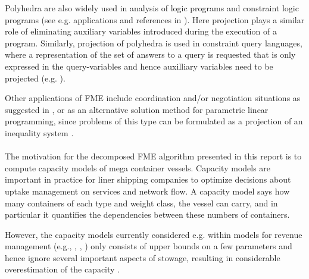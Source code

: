 Polyhedra are also widely used in analysis of logic programs and constraint logic programs (see e.g. applications and references in \cite{benoy05}). %
Here projection plays a similar role %
of eliminating auxiliary variables introduced during the execution of a program. Similarly, projection of polyhedra is used in constraint query languages, %
where a representation of the set of answers to a query is requested that is only expressed in the query-variables and hence auxilliary variables need to be projected (e.g. \cite{lassez90}).  

Other applications of FME include coordination and/or negotiation situations as suggested in \cite{lukatskii08}, 
or as an alternative solution method for parametric linear programming, since problems of this type can be formulated as a projection of an inequality system \cite{jones08}.
\\
\\
The motivation for the decomposed FME algorithm presented in this report is to compute capacity models of mega container vessels. Capacity models are important in practice for liner shipping companies to optimize decisions about uptake management on services and network flow. A capacity model says how many containers of each type and weight class, the vessel can carry, and in particular it {quantifies} the dependencies between these numbers of containers. %

However, the capacity models currently considered e.g. within models for revenue management ({e.g., \cite{ting04}, \cite{feng08}, \cite{zurheide13}}) only consists of upper bounds on a few parameters and hence ignore several important aspects of stowage, resulting in considerable overestimation of the capacity \cite{AlbertosThesis}.


